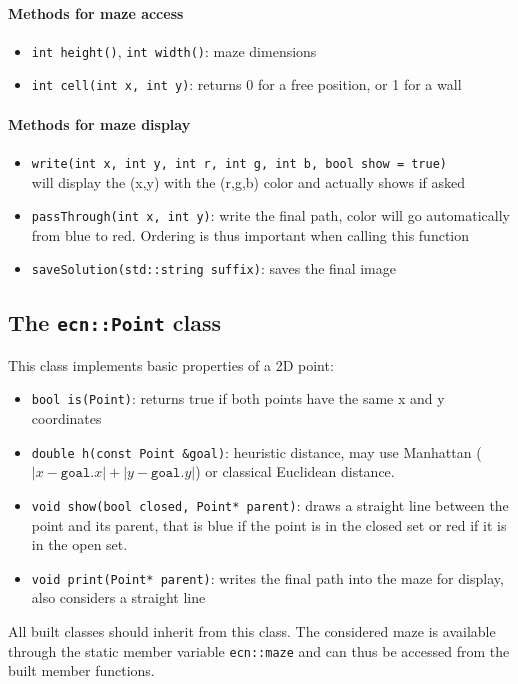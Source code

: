 \documentclass{ecnreport}
\begin{document}
\paragraph{Methods for maze access}
\begin{itemize}
 \item \texttt{int height()}, \texttt{int width()}: maze dimensions
 \item \texttt{int cell(int x, int y)}: returns 0 for a free position, or 1 for a wall
\end{itemize}

\paragraph{Methods for maze display}
\begin{itemize}
 \item \texttt{write(int x, int y, int r, int g, int b, bool show = true)}\\
    will display the (x,y) with the (r,g,b) color and actually shows if asked
 \item \texttt{passThrough(int x, int y)}: write the final path, color will go automatically from blue to red. 
 Ordering is thus important when calling this function
 \item \texttt{saveSolution(std::string suffix)}: saves the final image
\end{itemize}

\subsection{The \texttt{ecn::Point} class}\label{ptClass}

This class implements basic properties of a 2D point:

\begin{itemize}
 \item \texttt{bool is(Point)}: returns true if both points have the same x and y coordinates
 \item \texttt{double h(const Point \&goal)}: heuristic distance, may use Manhattan
 ($|x-\texttt{goal}.x| + |y-\texttt{goal}.y|$) or classical Euclidean distance.
 \item \texttt{void show(bool closed, Point* parent)}: draws a straight line between the point and its parent, that
 is blue if the point is in the closed set or red if it is in the open set.
 \item \texttt{void print(Point* parent)}: writes the final path into the maze for display, also considers a straight line
\end{itemize}
All built classes should inherit from this class. The considered maze is available through the static member variable \texttt{ecn::maze} and can thus
be accessed from the built member functions.
\end{document}
